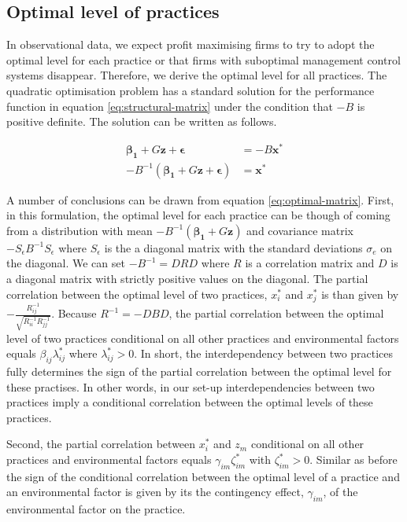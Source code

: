 \documentclass[12pt]{article}
\begin{document}
\subsection{Optimal level of practices}\label{optimal-practices}

In observational data, we expect profit maximising firms to try to adopt the optimal level for each practice or that firms with suboptimal management control systems disappear. Therefore, we derive the optimal level for all practices. The quadratic optimisation problem has a standard solution for the performance function in equation \eqref{eq:structural-matrix} under the condition that $-B$ is positive definite. The solution can be written as follows.

\begin{equation} \label{eq:optimal-matrix}
\begin{aligned} 
    \mathbf{\beta_1} + G \mathbf{z} + \mathbf{\epsilon} & = -B \mathbf{x^*} \\
    - B^{-1} (\mathbf{\beta_1} +  G \mathbf{z} + \mathbf{\epsilon})  & = \mathbf{x^*}
\end{aligned}
\end{equation}

A number of conclusions can be drawn from equation \eqref{eq:optimal-matrix}. First, in this formulation, the optimal level for each practice can be though of coming from a distribution with mean $-B^{-1} (\mathbf{\beta_1} + G \mathbf{z})$ and covariance matrix $-S_{\epsilon} B^{-1} S_{\epsilon}$ where $S_{\epsilon}$ is the a diagonal matrix with the standard deviations $\sigma_e$ on the diagonal. We can set $-B^{-1} = DRD$ where $R$ is a correlation matrix and $D$ is a diagonal matrix with strictly positive values on the diagonal. The partial correlation between the optimal level of two practices, $x^*_i$ and $x^*_j$ is than given by $-\frac{R^{-1}_{ij}}{\sqrt{R^{-1}_{ii} R^{-1}_{jj}}}$. Because $R^{-1} = - DBD$, the partial correlation between the optimal level of two practices conditional on all other practices and environmental factors equals $\beta_{ij}\lambda_{ij}^*$ where $\lambda_{ij}^* > 0$. In short, the interdependency between two practices fully determines the sign of the partial correlation between the optimal level for these practises. In other words, in our set-up interdependencies between two practices imply a conditional correlation between the optimal levels of these practices. 

Second, the partial correlation between $x^*_i$ and $z_m$ conditional on all other practices and environmental factors equals $\gamma_{im} \zeta_{im}^*$ with $\zeta_{im}^* > 0$. Similar as before the sign of the conditional correlation between the optimal level of a practice and an environmental factor is given by its the contingency effect, $\gamma_{im}$, of the environmental factor on the practice. 
\end{document}
